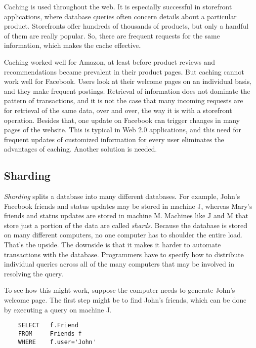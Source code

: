 Caching is used throughout the web.
It is especially successful in storefront applications,
where database queries often concern details about a particular product.
Storefronts offer hundreds of thousands of products,
but only a handful of them are really popular.
So, there are frequent requests for the same information,
which makes the cache effective.

Caching worked well for Amazon, at least before product reviews
and recommendations became prevalent in their product pages.
But caching cannot work well for Facebook.
Users look at their welcome pages on an individual basis,
and they make frequent postings. Retrieval of information
does not dominate the pattern of transactions,
and it is not the case that many incoming requests
are for retrieval of the same data, over and over,
the way it is with a storefront operation.
Besides that, one update on Facebook can trigger changes in many pages of the website.
This is typical in Web 2.0 applications,
and this need for frequent updates of customized information
for every user eliminates the advantages of caching.
Another solution is needed.

\subsection{Sharding}

\emph{Sharding} splits a database into many different databases.
For example, John's Facebook friends and status updates may be stored in machine J, whereas
Mary's friends and status updates are stored in machine M.
Machines like J and M that store just a portion of the data are called \emph{shards}.
Because the database is stored on many different computers,
no one computer has to shoulder the entire load.
That's the upside.
The downside is that it makes it harder
to automate transactions with the database.
Programmers have to specify how to distribute
individual queries across all of the many computers
that may be involved in resolving the query.

To see how this might work,
suppose the computer needs to generate John's welcome page.
The first step might be to find John's friends,
which can be done by executing a query on machine J.
\begin{code}
\begin{verbatim}
	SELECT   f.Friend
	FROM     Friends f
	WHERE    f.user='John'
\end{verbatim}
\end{code}

